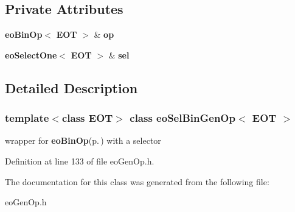 \subsection*{Private Attributes}
\begin{CompactItemize}
\item 
{\bf eo\-Bin\-Op}$<$ {\bf EOT} $>$ \& {\bf op}\label{classeo_sel_bin_gen_op_r0}

\item 
{\bf eo\-Select\-One}$<$ {\bf EOT} $>$ \& {\bf sel}\label{classeo_sel_bin_gen_op_r1}

\end{CompactItemize}


\subsection{Detailed Description}
\subsubsection*{template$<$class EOT$>$ class eo\-Sel\-Bin\-Gen\-Op$<$ EOT $>$}

wrapper for {\bf eo\-Bin\-Op}{\rm (p.\,\pageref{classeo_bin_op})} with a selector 



Definition at line 133 of file eo\-Gen\-Op.h.

The documentation for this class was generated from the following file:\begin{CompactItemize}
\item 
eo\-Gen\-Op.h\end{CompactItemize}
